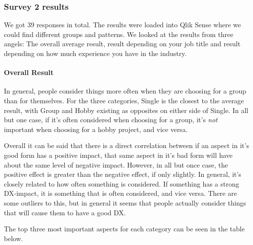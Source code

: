 \documentclass{article}
\begin{document}
\subsubsection{Survey 2 results}

We got 39 responses in total. The results were loaded into Qlik Sense
where we could find different groups and patterns. We looked at the
results from three angels: The overall average result, result depending
on your job title and result depending on how much experience you have
in the industry.

\paragraph{Overall Result}

In general, people consider things more often when they are choosing for
a group than for themselves. For the three categories, Single is the
closest to the average result, with Group and Hobby existing as
opposites on either side of Single. In all but one case, if it's often
considered when choosing for a group, it's \textit{not} important when choosing
for a hobby project, and vice versa.

Overall it can be said that there is a direct correlation between if an
aspect in it's good form has a positive impact, that same aspect in it's
bad form will have about the same level of negative impact. However, in
all but once case, the positive effect is greater than the negative
effect, if only slightly. In general, it's closely related to how often
something is considered. If something has a strong DX-impact, it is
something that is often considered, and vice versa. There are some
outliers to this, but in general it seems that people actually consider
things that will cause them to have a good DX.

The top three most important aspects for each category can be seen in
the table below.
\end{document}
